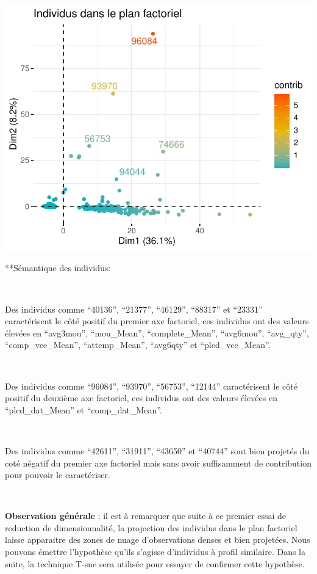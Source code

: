 \documentclass[]{imsart}
\numberwithin{equation}{section}
\theoremstyle{plain}
\begin{document}
~

\begin{flushleft}\includegraphics{Analyse_Exploratoire_Projet_files/figure-latex/unnamed-chunk-19-1} \end{flushleft}

**Sémantique des individus:

~

Des individus comme ``40136'', ``21377'', ``46129'', ``88317'' et ``23331'' caractérisent le côté positif du premier axe factoriel, ces individus ont des valeurs élevées en ``avg3mou'', ``mou\_Mean'', ``complete\_Mean'', ``avg6mou'', ``avg\_qty'', ``comp\_vce\_Mean'', ``attemp\_Mean'', ``avg6qty'' et ``plcd\_vce\_Mean''.

~

Des individus comme ``96084'', ``93970'', ``56753'', ``12144'' caractérisent le côté positif du deuxième axe factoriel, ces individus ont des valeurs élevées en ``plcd\_dat\_Mean'' et ``comp\_dat\_Mean''.

~

Des individus comme ``42611'', ``31911'', ``43650'' et ``40744'' sont bien projetés du coté négatif du premier axe factoriel mais sans avoir suffisamment de contribution pour pouvoir le caractériser.

~

\textbf{Observation générale} : il est à remarquer que suite à ce premier essai de reduction de dimensionnalité, la projection des individus dans le plan factoriel laisse apparaitre des zones de nuage d'observations denses et bien projetées. Nous pouvons émettre l'hypothèse qu'ils s'agisse d'individus à profil similaire. Dans la suite, la technique T-sne sera utilisée pour essayer de confirmer cette hypothèse.
\end{document}
